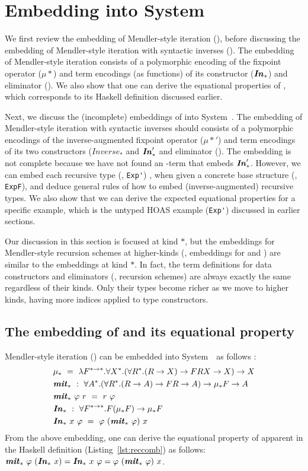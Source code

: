 \section{Embedding \msfit{} into System~\Fw{}}\label{sec:theory}

We first review the embedding of Mendler-style iteration (\MIt{*}),
before discussing the embedding of Mendler-style iteration with
syntactic inverses (\MIt{*}). The embedding of Mendler-style iteration
consists of a polymorphic encoding of the fixpoint operator ($\mu{*}$)
and term encodings (as functions) of its constructor ($\textbf{\textit{In}}_{*}$)
and eliminator (\MIt{*}). We also show that one can derive
the equational properties of \MIt{*}, which corresponds to
its Haskell definition discussed earlier.

Next, we discuss the (incomplete) embeddings of \msfit{*} into System~\Fw.
The embedding of Mendler-style iteration with syntactic inverses should
consists of a polymorphic encodings of the inverse-augmented fixpoint operator
($\mu{*}'$) and term encodings of its two constructors ($\textit{Inverse}_{*}$
and $\textbf{\textit{In}}_{*}'$ and eliminator (\msfit{*}). The embedding is not complete
because we have not found an \Fw-term that embeds $\textbf{\textit{In}}_{*}'$. However,
we can embed each recursive type (\eg, \lstinline{Exp'}) , when given
a concrete base structure (\eg, \lstinline{ExpF}), and deduce general rules
of how to embed (inverse-augmented) recursive types. We also show that we
can derive the expected equational properties for a specific example,
which is the untyped HOAS example (\lstinline{Exp'}) discussed
in earlier sections.

Our discussion in this section is focused at kind $*$, but the embeddings for
Mendler-style recursion schemes at higher-kinds (\eg, embeddings for
\MIt{*\to*} and \msfit{*\to*}) are similar to the embeddings at kind $*$.
In fact, the term definitions for data constructors and eliminators
(\ie, recursion schemes) are always exactly the same regardless of their kinds.
Only their types become richer as we move to higher kinds, having more indices
applied to type constructors.

\subsection{The embedding of \MIt{*} and its equational property}
Mendler-style iteration (\MIt{*}) can be embedded into System~\Fw\ as follows
\cite{TODO,TODO,TODO}:
\begin{align*}
&\mu_{*} ~=~ \lambda F^{* \to *}.\forall X^{*}.
		(\forall R^{*}.(R \to X) \to F R X \to X) \to X
	\\
&\textbf{\textit{mit}}_{*} ~:~ \forall A^{*}.
	(\forall R^{*}.(R \to A) \to F R \to A) \to \mu_{*} F \to A \\
&\textbf{\textit{mit}}_{*}~\varphi~r ~=~ r~\varphi
	\\
&\textbf{\textit{In}}_{*} ~:~\forall F^{* \to *}.F(\mu_{*} F) \to \mu_{*} F \\
&\textbf{\textit{In}}_{*}~x~\varphi ~=~ \varphi~(\textbf{\textit{mit}}_{*}~\varphi)~x
\end{align*}
From the above embedding, one can derive the equational property of \MsfIt{*}
apparent in the Haskell definition (Listing~\ref{lst:reccomb}) as follows:
$\textbf{\textit{mit}}_{*}~\varphi~(\textbf{\textit{In}}_{*}~x) = \textbf{\textit{In}}_{*}~x~\varphi = \varphi~(\textbf{\textit{mit}}_{*}~\varphi)~x$.

